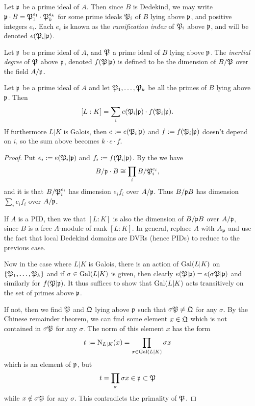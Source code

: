 \begin{definition}
  Let $\mathfrak{p}$ be a prime ideal of $A$. 
  Then since $B$ is Dedekind, we may write $\mathfrak{p} \cdot B = \mathfrak{P}_1^{e_1}\cdot\mathfrak{P}_k^{e_k}$ for some prime ideals $\mathfrak{P}_i$ of $B$ lying above $\mathfrak{p}$, and positive integers $e_i$.
  Each $e_i$ is known as the \emph{ramification index} of $\mathfrak{P}_i$ above $\mathfrak{p}$, and will be denoted $e(\mathfrak{P}_i|\mathfrak{p})$. 
\end{definition}
\begin{definition}
  Let $\mathfrak{p}$ be a prime ideal of $A$, and $\mathfrak{P}$ a prime ideal of $B$ lying above $\mathfrak{p}$.
  The \emph{inertial degree} of $\mathfrak{P}$ above $\mathfrak{p}$, denoted $f(\mathfrak{P}|\mathfrak{p})$ is defined to be the dimension of $B/\mathfrak{P}$ over the field $A/\mathfrak{p}$.
\end{definition}
\begin{lemma}\label{lemma:fundamental_equality}
  Let $\mathfrak{p}$ be a prime ideal of $A$ and let $\mathfrak{P}_{1},\ldots,\mathfrak{P}_{k}$ be all the primes of $B$ lying above $\mathfrak{p}$.
  Then
  \[ [L:K] = \sum_{i} e(\mathfrak{P}_{i}|\mathfrak{p}) \cdot f(\mathfrak{P}_{i}|\mathfrak{p}). \]
  If furthermore $L|K$ is Galois, then $e := e(\mathfrak{P}_{i}|\mathfrak{p})$ and $f := f(\mathfrak{P}_{i}|\mathfrak{p})$ doesn't depend on $i$, so the sum above becomes $k \cdot e \cdot f$.
\end{lemma}
\begin{proof}
  Put $e_{i} := e(\mathfrak{P}_{i}|\mathfrak{p})$ and $f_{i} := f(\mathfrak{P}_{i}|\mathfrak{p})$.
  By the  we have
  \[ B/\mathfrak{p} \cdot B \cong \prod_{i} B/\mathfrak{P}_{i}^{e_{i}}, \]
  and it is  that $B/\mathfrak{P}_{i}^{e_{i}}$ has dimension $e_{i} f_{i}$ over $A/\mathfrak{p}$.
  Thus $B/\mathfrak{p} B$ has dimension $\sum_{i} e_{i} f_{i}$ over $A/\mathfrak{p}$.

  If $A$ is a PID, then we  that $[L:K]$ is also the dimension of $B/\mathfrak{p} B$ over $A/\mathfrak{p}$, since $B$ is a free $A$-module of rank $[L:K]$.
  In general, replace $A$ with $A_{\mathfrak{p}}$ and use the fact that local Dedekind domains are DVRs (hence PIDs) to reduce to the previous case.

  Now in the case where $L|K$ is Galois, there is an action of $\operatorname{Gal}(L|K)$ on $\{\mathfrak{P}_{1},\ldots,\mathfrak{P}_{k}\}$ and if $\sigma \in \operatorname{Gal}(L|K)$ is given, then clearly $e(\mathfrak{P}|\mathfrak{p}) = e(\sigma\mathfrak{P}|\mathfrak{p})$ and similarly for $f(\mathfrak{P}|\mathfrak{p})$.
  It thus suffices to show that $\operatorname{Gal}(L|K)$ acts transitively on the set of primes above $\mathfrak{p}$.

  If not, then we find $\mathfrak{P}$ and $\mathfrak{Q}$ lying above $\mathfrak{p}$ such that $\sigma\mathfrak{P} \neq \mathfrak{Q}$ for any $\sigma$.
  By the Chinese remainder theorem, we can find some element $x \in \mathfrak{Q}$ which is not contained in $\sigma\mathfrak{P}$ for any $\sigma$.
  The norm of this element $x$ has the form
  \[ t := \operatorname{N}_{L|K}(x) = \prod_{\sigma \in \operatorname{Gal}(L|K)} \sigma x \]
  which is an element of $\mathfrak{p}$, but
  \[ t = \prod_{\sigma} \sigma x \in \mathfrak{p} \subset \mathfrak{P} \]
  while $x \notin \sigma \mathfrak{P}$ for any $\sigma$.
  This contradicts the primality of $\mathfrak{P}$.
\end{proof}

